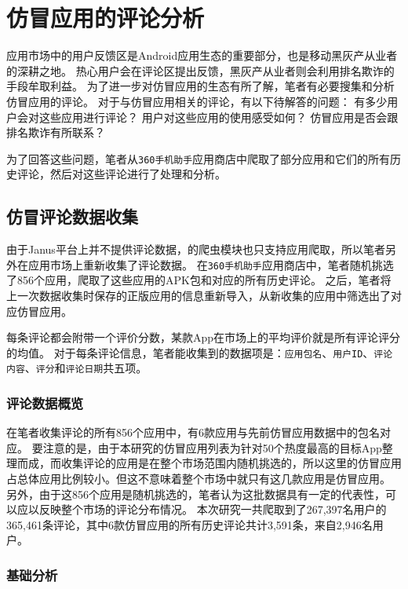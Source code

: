 \chapter{仿冒应用的评论分析}
\label{chp:feedback}

应用市场中的用户反馈区是Android应用生态的重要部分，也是移动黑灰产从业者的深耕之地。
热心用户会在评论区提出反馈，黑灰产从业者则会利用排名欺诈的手段牟取利益。
为了进一步对仿冒应用的生态有所了解，笔者有必要搜集和分析仿冒应用的评论。
对于与仿冒应用相关的评论，有以下待解答的问题：
有多少用户会对这些应用进行评论？
用户对这些应用的使用感受如何？
仿冒应用是否会跟排名欺诈有所联系？

为了回答这些问题，笔者从\texttt{360手机助手}应用商店中爬取了部分应用和它们的所有历史评论，然后对这些评论进行了处理和分析。

\section{仿冒评论数据收集}
由于Janus平台上并不提供评论数据，\mytool 的爬虫模块也只支持应用爬取，所以笔者另外在应用市场上重新收集了评论数据。
在\texttt{360手机助手}应用商店中，笔者随机挑选了856个应用，爬取了这些应用的APK包和对应的所有历史评论。
之后，笔者将上一次数据收集时保存的正版应用的信息重新导入\mytool，从新收集的应用中筛选出了对应仿冒应用。

每条评论都会附带一个评价分数，某款App在市场上的平均评价就是所有评论评分的均值。
对于每条评论信息，笔者能收集到的数据项是：\texttt{应用包名}、\texttt{用户ID}、\texttt{评论内容}、\texttt{评分}和\texttt{评论日期}共五项。

\subsection{评论数据概览}
在笔者收集评论的所有856个应用中，有6款应用与先前仿冒应用数据中的包名对应。
要注意的是，由于本研究的仿冒应用列表为针对50个热度最高的目标App整理而成，而收集评论的应用是在整个市场范围内随机挑选的，所以这里的仿冒应用占总体应用比例较小。但这不意味着整个市场中就只有这几款应用是仿冒应用。
另外，由于这856个应用是随机挑选的，笔者认为这批数据具有一定的代表性，可以应以反映整个市场的评论分布情况。
本次研究一共爬取到了267,397名用户的365,461条评论，其中6款仿冒应用的所有历史评论共计3,591条，来自2,946名用户。

\subsection{基础分析}

